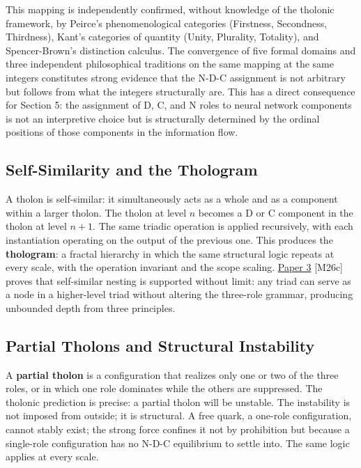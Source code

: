 \documentclass[12pt]{article}
\begin{document}
This mapping is independently confirmed, without knowledge of the
tholonic framework, by Peirce's phenomenological categories (Firstness,
Secondness, Thirdness), Kant's categories of quantity (Unity, Plurality,
Totality), and Spencer-Brown's distinction calculus. The convergence of
five formal domains and three independent philosophical traditions on
the same mapping at the same integers constitutes strong evidence that
the N-D-C assignment is not arbitrary but follows from what the integers
structurally are. This has a direct consequence for Section 5: the
assignment of D, C, and N roles to neural network components is not an
interpretive choice but is structurally determined by the ordinal
positions of those components in the information flow.

\subsection{Self-Similarity and the Thologram}\label{self-similarity-and-the-thologram}

A tholon is self-similar: it simultaneously acts as a whole and as a
component within a larger tholon. The tholon at level \(n\) becomes a D
or C component in the tholon at level \(n+1\). The same triadic
operation is applied recursively, with each instantiation operating on
the output of the previous one. This produces the \textbf{thologram}: a
fractal hierarchy in which the same structural logic repeats at every
scale, with the operation invariant and the scope scaling.
\href{https://github.com/baardev/truevalue/blob/main/docnav/Research/papers/3_minimal-recursive-triadic-framework/3_minimal-recursive-triadic-framework.pdf}{Paper
3} {[}M26c{]} proves that self-similar nesting is supported without
limit: any triad can serve as a node in a higher-level triad without
altering the three-role grammar, producing unbounded depth from three
principles.

\subsection{Partial Tholons and Structural Instability}\label{partial-tholons-and-structural-instability}

A \textbf{partial tholon} is a configuration that realizes only one or
two of the three roles, or in which one role dominates while the others
are suppressed. The tholonic prediction is precise: a partial tholon
will be unstable. The instability is not imposed from outside; it is
structural. A free quark, a one-role configuration, cannot stably exist;
the strong force confines it not by prohibition but because a
single-role configuration has no N-D-C equilibrium to settle into. The
same logic applies at every scale.
\end{document}
